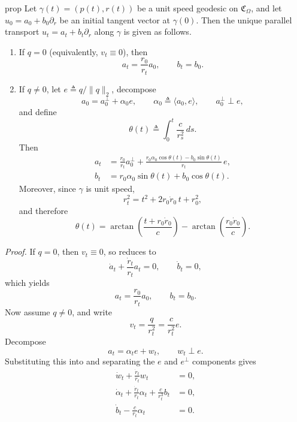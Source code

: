 \documentclass[11pt]{article}
\begin{document}
\begin{restatable}{prop}{} \label{cone PT explicit}
    Let $\gamma(t) = (p(t), r(t))$ be a unit speed geodesic on $\mathfrak{C}_\Omega$, and let
    $u_0 = a_0 + b_0\partial_r$ be an initial tangent vector at $\gamma(0)$.
    Then the unique parallel transport $u_t = a_t + b_t\partial_r$ along $\gamma$ is given as follows.
    \begin{enumerate}
        \item If $q = 0$ (equivalently, $v_t \equiv 0$), then
        \[
        a_t = \frac{r_0}{r_t}a_0,
        \qquad
        b_t = b_0.
        \]
        \item If $q \neq 0$, let $e \triangleq q/\|q\|_2$, decompose
    \[
    a_0 = a_0^\perp + \alpha_0 e,
    \qquad
    \alpha_0 \triangleq \langle a_0, e\rangle,
    \qquad
    a_0^\perp \perp e,
    \]
    and define
    \[
    \theta(t) \triangleq \int_0^t \frac{c}{r_s^2}\,ds.
    \]
    Then
    \begin{align}
        a_t &= \frac{r_0}{r_t}a_0^\perp
        + \frac{r_0\alpha_0\cos\theta(t) - b_0\sin\theta(t)}{r_t}\,e,
        \label{eq: cone PT explicit a}\\
        b_t &= r_0\alpha_0\sin\theta(t) + b_0\cos\theta(t).
        \label{eq: cone PT explicit b}
    \end{align}
    Moreover, since $\gamma$ is unit speed,
    \[
    r_t^2 = t^2 + 2r_0\dot r_0\,t + r_0^2,
    \]
    and therefore
    \[
    \theta(t)
    = \arctan\!\left(\frac{t + r_0\dot r_0}{c}\right)
    - \arctan\!\left(\frac{r_0\dot r_0}{c}\right).
    \]
    \end{enumerate}
    

    
\end{restatable}
\noindent \textit{Proof.}
If $q=0$, then $v_t \equiv 0$, so  reduces to
\[
\dot a_t + \frac{\dot r_t}{r_t}a_t = 0,
\qquad
\dot b_t = 0,
\]
which yields
\[
a_t = \frac{r_0}{r_t}a_0,
\qquad
b_t = b_0.
\]
Now assume $q \neq 0$, and write
\[
v_t = \frac{q}{r_t^2} = \frac{c}{r_t^2}e.
\]
Decompose
\[
a_t = \alpha_t e + w_t,
\qquad
w_t \perp e.
\]
Substituting this into  and separating the $e$ and $e^\perp$ components gives
\begin{align}
    \dot w_t + \frac{\dot r_t}{r_t}w_t &= 0, \label{eq: cone PT w}\\
    \dot\alpha_t + \frac{\dot r_t}{r_t}\alpha_t + \frac{c}{r_t^3}b_t &= 0, \label{eq: cone PT alpha}\\
    \dot b_t - \frac{c}{r_t}\alpha_t &= 0. \label{eq: cone PT b}
\end{align}
\end{document}
